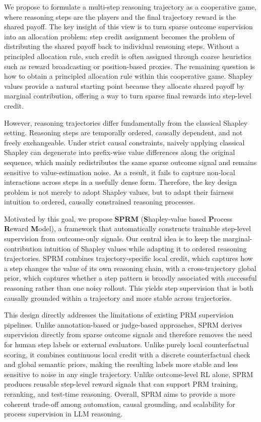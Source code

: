We propose to formulate a multi-step reasoning trajectory as a cooperative
game, where reasoning steps are the players and the final trajectory reward is
the shared payoff.
The key insight of this view is to turn sparse outcome supervision into an
allocation problem: step credit assignment becomes the problem of distributing
the shared payoff back to individual reasoning steps.
Without a principled allocation rule, such credit is often assigned through
coarse heuristics such as reward broadcasting or position-based proxies.
The remaining question is how to obtain a principled allocation rule within
this cooperative game.
Shapley values provide a natural starting point because they allocate shared
payoff by marginal contribution, offering a way to turn sparse final rewards
into step-level credit.


However, reasoning trajectories differ fundamentally from the classical
Shapley setting.
Reasoning steps are temporally ordered, causally dependent, and not freely
exchangeable.
Under strict causal constraints,
naively applying classical Shapley can
degenerate into prefix-wise value differences along the original sequence,
which mainly redistributes the same sparse outcome signal and remains sensitive
to value-estimation noise.
As a result, it fails to capture non-local interactions across steps in a
usefully dense form.
Therefore, the key design problem is not merely to adopt Shapley values, but
to adapt their fairness intuition to ordered, causally constrained reasoning
processes.

Motivated by this goal, we propose \textbf{SPRM}
(\textbf{S}hapley-value based \textbf{P}rocess \textbf{R}eward
\textbf{M}odel), a framework that automatically constructs trainable
step-level supervision from outcome-only signals.
Our central idea is to keep the marginal-contribution intuition of Shapley
values while adapting it to ordered reasoning trajectories.
SPRM combines trajectory-specific local credit, which captures how a step
changes the value of its own reasoning chain, with a cross-trajectory global
prior, which captures whether a step pattern is broadly associated with
successful reasoning rather than one noisy rollout.
This yields step supervision that is both causally grounded within a
trajectory and more stable across trajectories.

This design directly addresses the limitations of existing PRM supervision
pipelines.
Unlike annotation-based\cite{uesato2022solving,lightman2023lets} or judge-based approaches\cite{zeng2025versaprm, duan2025efficient,yang2025beyond,wang2025athena,cao2025dreamprm}, SPRM derives supervision
directly from sparse outcome signals and therefore removes the need for human
step labels or external evaluators.
Unlike purely local counterfactual scoring, it combines continuous local credit
with a discrete counterfactual check and global semantic priors, making the
resulting labels more
stable and less sensitive to noise in any single trajectory.
Unlike outcome-level RL alone, SPRM produces reusable step-level reward
signals that can support PRM training, reranking, and test-time reasoning.
Overall, SPRM aims to provide a more coherent trade-off among automation,
causal grounding, and scalability for process supervision in LLM reasoning.

